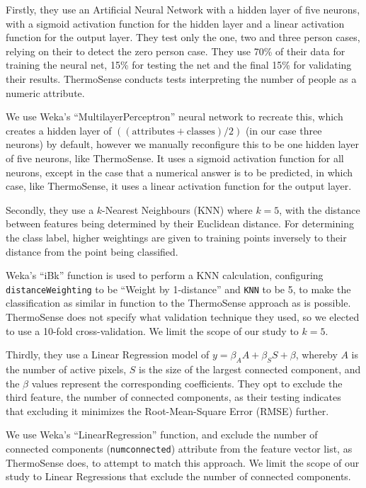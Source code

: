 \documentclass[../thesis/thesis.tex]{subfiles}
\begin{document}
Firstly, they use an Artificial Neural Network with a hidden layer of five neurons, with a sigmoid activation function for the hidden layer and a linear activation function for the output layer. They test only the one, two and three person cases, relying on their \pir to detect the zero person case. They use 70\% of their data for training the neural net, 15\% for testing the net and the final 15\% for validating their results. ThermoSense conducts tests interpreting the number of people as a numeric attribute.

We use Weka's ``MultilayerPerceptron'' neural network to recreate this, which creates a hidden layer of $((\mathrm{attributes} + \mathrm{classes}) / 2)$ (in our case three neurons) by default, however we manually reconfigure this to be one hidden layer of five neurons, like ThermoSense. It uses a sigmoid activation function for all neurons, except in the case that a numerical answer is to be predicted, in which case, like ThermoSense, it uses a linear activation function for the output layer.

Secondly, they use a $k$-Nearest Neighbours (KNN) where $k=5$, with the distance between features being determined by their Euclidean distance. For determining the class label, higher weightings are given to training points inversely to their distance from the point being classified.

Weka's ``iBk'' function is used to perform a KNN calculation, configuring \texttt{distanceWeighting} to be ``Weight by 1-distance'' and \texttt{KNN} to be 5, to make the classification as similar in function to the ThermoSense approach as is possible. ThermoSense does not specify what validation technique they used, so we elected to use a 10-fold cross-validation. We limit the scope of our study to $k = 5$.

Thirdly, they use a Linear Regression model of $y = \beta_A A + \beta_S S + \beta $, whereby $A$ is the number of active pixels, $S$ is the size of the largest connected component, and the $\beta$ values represent the corresponding coefficients. They opt to exclude the third feature, the number of connected components, as their testing indicates that excluding it minimizes the Root-Mean-Square Error (RMSE) further. 

We use Weka's ``LinearRegression'' function, and exclude the number of connected components (\texttt{numconnected}) attribute from the feature vector list, as ThermoSense does, to attempt to match this approach. We limit the scope of our study to Linear Regressions that exclude the number of connected components.
\end{document}
